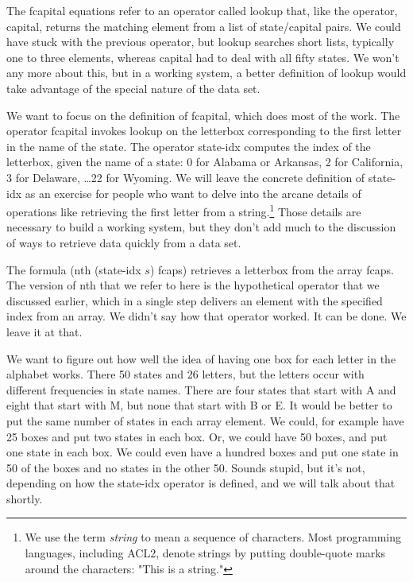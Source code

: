 The \textsf{fcapital} equations refer to an operator
called \textsf{lookup} that, like the operator, \textsf{capital},
returns the matching element from a list of state/capital pairs.
We could have stuck with the previous operator,
but \textsf{lookup} searches short lists,
typically one to three elements,
whereas \textsf{capital} had to deal with all fifty states.
We won't any more about this, but in a working system,
a better definition of \textsf{lookup}
would take advantage of the special nature of the data set.

We want to focus on the definition of \textsf{fcapital},
which does most of the work.
The operator \textsf{fcapital} invokes \textsf{lookup}
on the letterbox corresponding to the first letter
in the name of the state.
The operator \textsf{state-idx} computes the index
of the letterbox, given the name of a state:
0 for Alabama or Arkansas, 2 for California,
3 for Delaware, \dots 22 for  Wyoming.
We will leave the concrete
definition of \textsf{state-idx} as an exercise for
people who want to delve into the arcane details of
operations like retrieving the first letter from a 
string.\footnote{We use the term \emph{string} 
to mean a sequence of characters. 
Most programming languages, including ACL2,
denote strings by putting double-quote marks
around the characters: \textsf{"This is a string."}}
Those details are necessary to build a working system,
but they don't add much to the discussion of ways
to retrieve data quickly from a data set.

The formula
\textsf{(nth (state-idx $s$) fcaps)}
retrieves a letterbox from the array \textsf{fcaps}.
The version of \textsf{nth} that we refer to here
is the hypothetical operator that we discussed earlier,
which in a single step delivers an element
with the specified index from an array.
We didn't say how that operator worked.
It can be done. We leave it at that.

We want to figure out
how well the idea of having one box for each letter
in the alphabet works.
There 50 states and 26 letters, but the letters occur
with different frequencies in state names.
There are four states that start with A and
eight that start with M,
but none that start with B or E.
It would be better to put the same number of states in each
array element. We could, for example have 25 boxes and put
two states in each box. Or, we could have 50 boxes, and put
one state in each box.
We could even have a hundred boxes and put one state in 50
of the boxes and no states in the other 50.
Sounds stupid, but it's not, depending on how
the \textsf{state-idx} operator is defined,
and we will talk about that shortly.

